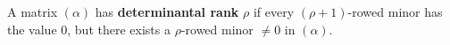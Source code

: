A matrix $(\alpha)$ has \textbf{determinantal rank} $\rho$ if every $(\rho + 1)$-rowed minor has the value $0$, but there exists a $\rho$-rowed minor $\neq 0$ in $(\alpha)$.
